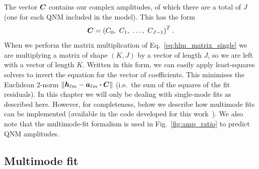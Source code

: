 The vector $\vb*{C}$ contains our complex amplitudes, of which there are a total of $J$ (one for each QNM included in the model). This has the form
\begin{equation}
    \vb*{C} = \left(C_0,\ C_1,\ \ldots,\ C_{J-1}\right)^T.
\end{equation}
When we perform the matrix multiplication of Eq.~\ref{eq:hlm_matrix_single} we are multiplying a matrix of shape $(K,J)$ by a vector of length $J$, so we are left with a vector of length $K$.
Written in this form, we can easily apply least-squares solvers to invert the equation for the vector of coefficients. 
This minimises the Euclidean 2-norm $\norm{\vb*{h}_{\ell m} - \vb*{a}_{\ell m} \vdot \vb*{C}}$ (i.e.\ the sum of the squares of the fit residuals).
In this chapter we will only be dealing with single-mode fits as described here.
However, for completeness, below we describe how multimode fits can be implemented (available in the code developed for this work~\cite{qnmfits}).
We also note that the multimode-fit formalism is used in Fig.~\ref{fig:amp_ratio} to predict QNM amplitudes.

\subsection{Multimode fit}

